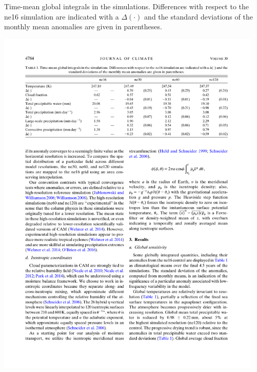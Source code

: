 \begin{table}[t]
\caption{Time-mean global integrals in the simulations. Differences with respect to the ne16 simulation are indicated with a $\Delta ( \cdot )$ and the standard deviations of the monthly mean anomalies are given in parentheses.}
\begin{center}
\noindent\includegraphics[width=30pc,angle=0]{chapter2/table1.pdf}\\
\end{center}
\label{tbl:table2-1}
\end{table}


